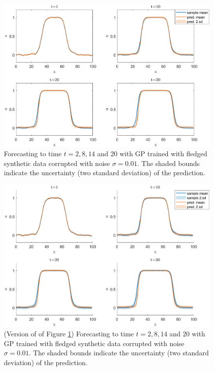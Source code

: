 \documentclass[smallextended,natbib]{svjour3}       %
\begin{document}
\newpage
\begin{figure}[H]
\centerline{\includegraphics[width=\textwidth]{chapterGP/figures/bistable-noi}}
\caption{\label{fig:u subplot ic1} Forecasting to time $t=2,8,14$ and $20$ with GP trained with fledged synthetic data corrupted with noise $\sigma=0.01$. The shaded bounds indicate the uncertainty (two standard deviation) of the prediction.} 
\end{figure}

\begin{figure}[H]
\centerline{\includegraphics[width=\textwidth]{chapterGP/figures/bistable-noi2}}
\caption{\label{fig:u subplot ic1 v2} (Version of of Figure \ref{fig:u subplot ic1}) Forecasting to time $t=2,8,14$ and $20$ with GP trained with fledged synthetic data corrupted with noise $\sigma=0.01$. The shaded bounds indicate the uncertainty (two standard deviation) of the prediction.} 
\end{figure}
\end{document}
